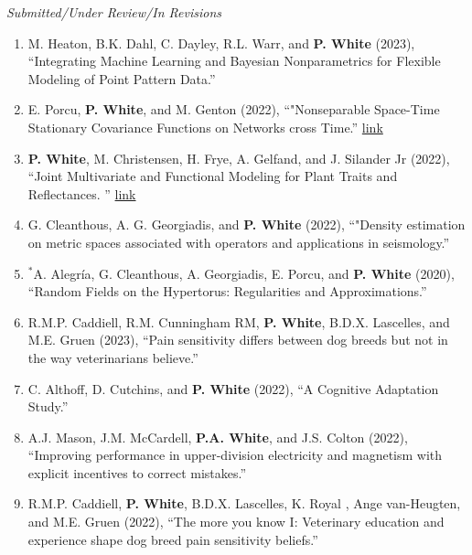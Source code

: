 \documentclass[11pt]{article}
\begin{document}
\emph{Submitted/Under Review/In Revisions}

\begin{enumerate}[label=$\bullet$]


\item M. Heaton, B.K. Dahl, C. Dayley, R.L. Warr, and \textbf{P. White} (2023), ``Integrating Machine Learning and Bayesian Nonparametrics for Flexible Modeling of Point Pattern Data.''


\item E. Porcu, \textbf{P. White}, and M. Genton (2022), ``"Nonseparable Space-Time Stationary Covariance Functions on Networks cross Time.'' \href{https://arxiv.org/abs/2208.03359}{link}

\item \textbf{P. White}, M. Christensen, H. Frye, A. Gelfand, and J. Silander Jr (2022), ``Joint Multivariate and Functional Modeling for Plant Traits and Reflectances.
''  \href{https://arxiv.org/abs/2210.00409}{link}

\item G. Cleanthous, A. G. Georgiadis, and \textbf{P. White} (2022), ``"Density estimation on metric spaces associated with operators and applications in seismology.''


\item $^*$A. Alegr\'ia, G. Cleanthous, A. Georgiadis, E. Porcu, and \textbf{P. White} (2020), ``Random Fields on the Hypertorus: Regularities and Approximations.'' 

\item R.M.P. Caddiell, R.M. Cunningham RM, \textbf{P. White}, B.D.X. Lascelles, and M.E. Gruen (2023),  ``Pain sensitivity differs between dog breeds but not in the way veterinarians believe.''

\item C. Althoff, D. Cutchins, and \textbf{P. White} (2022), ``A Cognitive Adaptation Study.'' 

\item A.J. Mason, J.M. McCardell, \textbf{P.A. White}, and J.S. Colton (2022), ``Improving performance in upper-division electricity and magnetism with explicit incentives to correct mistakes.'' 

\item  R.M.P. Caddiell, \textbf{P. White}, B.D.X. Lascelles, K. Royal , Ange van-Heugten, and M.E. Gruen (2022), ``The more you know I: Veterinary education and experience shape dog breed pain sensitivity beliefs.''


\end{enumerate}
\end{document}
